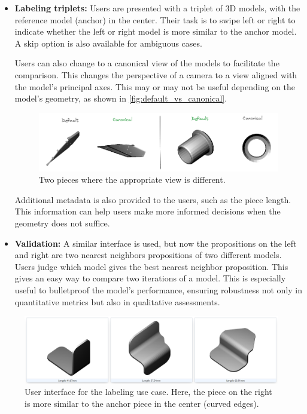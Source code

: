 \begin{itemize}
  \item \textbf{Labeling triplets:} Users are presented with a triplet of 3D models, with the reference model (anchor) in the center. Their task is to swipe left or right to indicate whether the left or right model is more similar to the anchor model. A skip option is also available for ambiguous cases.
  
  Users can also change to a canonical view of the models to facilitate the comparison. This changes the perspective of a camera to a view aligned with the model's principal axes. This may or may not be useful depending on the model's geometry, as shown in \autoref{fig:default_vs_canonical}.

\begin{figure}[]
  \centering
  \includegraphics[width=\columnwidth]{images/default_vs_canonical.png}
  \caption{Two pieces where the appropriate view is different.}
  \label{fig:default_vs_canonical}
\end{figure}

  Additional metadata is also provided to the users, such as the piece length. This information can help users make more informed decisions when the geometry does not suffice.
  \item \textbf{Validation:} A similar interface is used, but now the propositions on the left and right are two nearest neighbors propositions of two different models. Users judge which model gives the best nearest neighbor proposition. This gives an easy way to compare two iterations of a model. This is especially useful to bulletproof the model's performance, ensuring robustness not only in quantitative metrics but also in qualitative assessments.
  
\end{itemize}

\begin{figure}[]
  \centering
  \includegraphics[width=0.8\columnwidth]{images/tinder3d_labeling.png}
  \caption{User interface for the labeling use case. Here, the piece on the right is more similar to the anchor piece in the center (curved edges).}
  \label{fig:labeling_use_case}
\end{figure}

